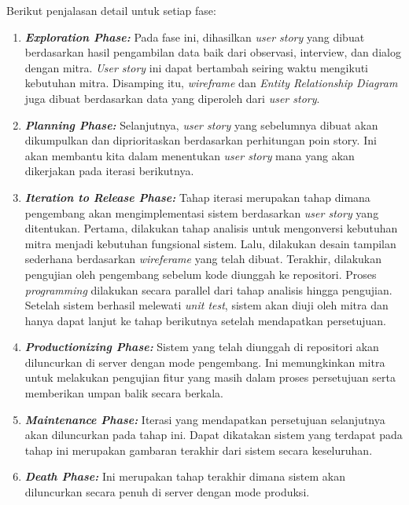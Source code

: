 Berikut penjalasan detail untuk setiap fase:
\begin{enumerate}
    \item \textbf{\textit{Exploration Phase:}}
    Pada fase ini, dihasilkan \textit{user story} yang dibuat berdasarkan hasil pengambilan data baik dari observasi, interview, dan dialog dengan mitra. \textit{User story} ini dapat bertambah seiring waktu mengikuti kebutuhan mitra. Disamping itu, \textit{wireframe} dan \textit{Entity Relationship Diagram} juga dibuat berdasarkan data yang diperoleh dari \textit{user story}.

    \item \textbf{\textit{Planning Phase:}}
    Selanjutnya, \textit{user story} yang sebelumnya dibuat akan dikumpulkan dan diprioritaskan berdasarkan perhitungan poin story. Ini akan membantu kita dalam menentukan \textit{user story} mana yang akan dikerjakan pada iterasi berikutnya.

    \item \textbf{\textit{Iteration to Release Phase:}}
    Tahap iterasi merupakan tahap dimana pengembang akan mengimplementasi sistem berdasarkan \textit{user story} yang ditentukan. Pertama, dilakukan tahap analisis untuk mengonversi kebutuhan mitra menjadi kebutuhan fungsional sistem. Lalu, dilakukan desain tampilan sederhana berdasarkan \textit{wireferame} yang telah dibuat. Terakhir, dilakukan pengujian oleh pengembang sebelum kode diunggah ke repositori. Proses \textit{programming} dilakukan secara parallel dari tahap analisis hingga pengujian. Setelah sistem berhasil melewati \textit{unit test}, sistem akan diuji oleh mitra dan hanya dapat lanjut ke tahap berikutnya setelah mendapatkan persetujuan.

    \item \textbf{\textit{Productionizing Phase:}}
    Sistem yang telah diunggah di repositori akan diluncurkan di server dengan mode pengembang. Ini memungkinkan mitra untuk melakukan pengujian fitur yang masih dalam proses persetujuan serta memberikan umpan balik secara berkala.

    \item \textbf{\textit{Maintenance Phase:}}
    Iterasi yang mendapatkan persetujuan selanjutnya akan diluncurkan pada tahap ini. Dapat dikatakan sistem yang terdapat pada tahap ini merupakan gambaran terakhir dari sistem secara keseluruhan.

    \item \textbf{\textit{Death Phase:}}
    Ini merupakan tahap terakhir dimana sistem akan diluncurkan secara penuh di server dengan mode produksi.
\end{enumerate}

